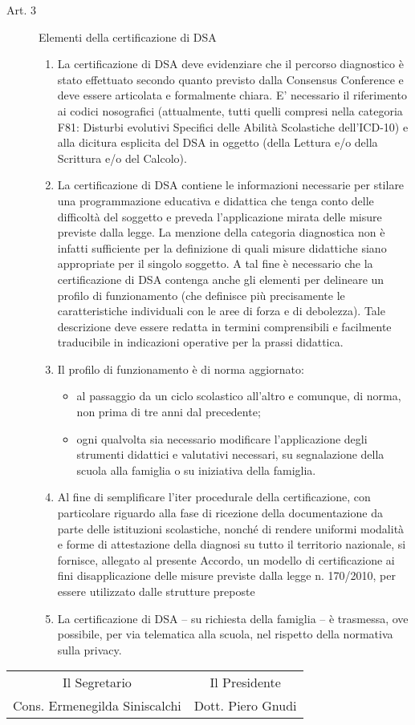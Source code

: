 \begin{description}
\begin{enumerate}
			\end{enumerate}
\item [Art. 3]Elementi della certificazione di DSA
\begin{enumerate}
	\item La certificazione di DSA deve evidenziare che il percorso diagnostico è stato effettuato secondo quanto previsto dalla Consensus Conference e deve essere articolata e formalmente chiara. E’ necessario il riferimento ai codici nosografici (attualmente, tutti quelli compresi nella categoria F81: Disturbi evolutivi Specifici delle Abilità Scolastiche dell'ICD-10) e alla dicitura esplicita del DSA in oggetto (della Lettura e/o della Scrittura e/o del Calcolo).
	\item La certificazione di DSA contiene le informazioni necessarie per stilare una programmazione educativa e didattica che tenga conto delle difficoltà del soggetto e preveda l'applicazione mirata delle misure previste dalla legge. La menzione della categoria diagnostica non è infatti sufficiente per la definizione di quali misure didattiche siano appropriate per il singolo soggetto. A tal fine è necessario che la certificazione di DSA contenga anche gli elementi per delineare un profilo di funzionamento (che definisce più precisamente le caratteristiche individuali con le aree di forza e di debolezza). Tale descrizione deve essere redatta in termini comprensibili e facilmente traducibile in indicazioni operative per la prassi didattica.
	\item Il profilo di funzionamento è di norma aggiornato:
	\begin{itemize}
		\item al passaggio da un ciclo scolastico all'altro e comunque, di norma, non prima di tre anni dal precedente;
		\item ogni qualvolta sia necessario modificare l'applicazione degli strumenti didattici e valutativi necessari, su segnalazione della scuola alla famiglia o su iniziativa della famiglia.
	\end{itemize}
	\item Al fine di semplificare l'iter procedurale della certificazione, con particolare riguardo alla fase di ricezione della documentazione da parte delle istituzioni scolastiche, nonché di rendere uniformi modalità e forme di attestazione della diagnosi su tutto il territorio nazionale, si fornisce, allegato al presente Accordo, un modello di certificazione ai fini disapplicazione delle misure previste dalla legge n. 170/2010, per essere utilizzato dalle strutture preposte
	\item La certificazione di DSA -- su richiesta della famiglia -- è trasmessa, ove possibile, per via telematica alla scuola, nel rispetto della normativa sulla privacy.
\end{enumerate}
\end{description}

\begin{tabular*}{\textwidth}%
	{@{\extracolsep{\fill}}cc}
Il Segretario	&Il Presidente\\
	Cons. Ermenegilda Siniscalchi&Dott. Piero Gnudi
\end{tabular*}

